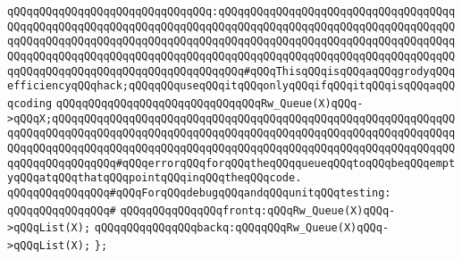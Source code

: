 \verb|qQQqqQQqqQQqqQQqqQQqqQQqqQQqqQQq:qQQqqQQqqQQqqQQqqQQqqQQqqQQqqQQqqQQqqQQqqQQqqQQqqQQqqQQqqQQqqQQqqQQqqQQqqQQqqQQqqQQqqQQqqQQqqQQqqQQqqQQqqQQqqQQqqQQqqQQqqQQqqQQqqQQqqQQqqQQqqQQqqQQqqQQqqQQqqQQqqQQqqQQqqQQqqQQqqQQqqQQqqQQqqQQqqQQqqQQqqQQqqQQqqQQqqQQqqQQqqQQqqQQqqQQqqQQqqQQqqQQqqQQqqQQqqQQqqQQqqQQqqQQqqQQqqQQqqQQqqQQq#qQQqThisqQQqisqQQqaqQQqgrodyqQQqefficiencyqQQqhack;qQQqqQQquseqQQqitqQQqonlyqQQqifqQQqitqQQqisqQQqaqQQqcoding|\newline
\verb|qQQqqQQqqQQqqQQqqQQqqQQqqQQqqQQqRw_Queue(X)qQQq->qQQqX;qQQqqQQqqQQqqQQqqQQqqQQqqQQqqQQqqQQqqQQqqQQqqQQqqQQqqQQqqQQqqQQqqQQqqQQqqQQqqQQqqQQqqQQqqQQqqQQqqQQqqQQqqQQqqQQqqQQqqQQqqQQqqQQqqQQqqQQqqQQqqQQqqQQqqQQqqQQqqQQqqQQqqQQqqQQqqQQqqQQqqQQqqQQqqQQqqQQqqQQqqQQqqQQqqQQqqQQqqQQq#qQQqerrorqQQqforqQQqtheqQQqqueueqQQqtoqQQqbeqQQqemptyqQQqatqQQqthatqQQqpointqQQqinqQQqtheqQQqcode.|\newline
\newline
\verb|qQQqqQQqqQQqqQQq#qQQqForqQQqdebugqQQqandqQQqunitqQQqtesting:|\newline
\verb|qQQqqQQqqQQqqQQq#|\newline
\verb|qQQqqQQqqQQqqQQqfrontq:qQQqRw_Queue(X)qQQq->qQQqList(X);|\newline
\verb|qQQqqQQqqQQqqQQqbackq:qQQqqQQqRw_Queue(X)qQQq->qQQqList(X);|\newline
\verb|};|\newline
\newline

